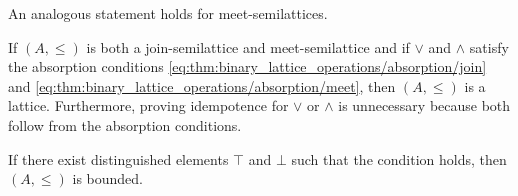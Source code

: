 \begin{proposition}
\begin{thmenum}
    An analogous statement holds for meet-semilattices.

     If \( (A, \leq) \) is both a join-semilattice and meet-semilattice and if \( \vee \) and \( \wedge \) satisfy the absorption conditions \eqref{eq:thm:binary_lattice_operations/absorption/join} and \eqref{eq:thm:binary_lattice_operations/absorption/meet}, then \( (A, \leq) \) is a lattice. Furthermore, proving idempotence for \( \vee \) or \( \wedge \) is unnecessary because both follow from the absorption conditions.

    If there exist distinguished elements \( \top \) and \( \bot \) such that the condition  holds, then \( (A, \leq) \) is bounded.
  \end{thmenum}
\end{proposition}
